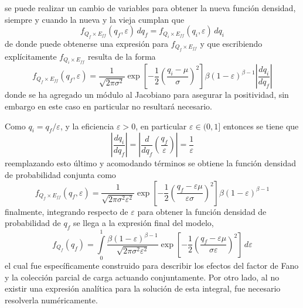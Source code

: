 se puede realizar un cambio de variables para obtener la nueva función densidad, siempre y cuando la nueva y la vieja cumplan que
\begin{equation*}
    f_{Q_{f}\times E_{ff}}(q_{f}, \varepsilon)\,dq_{f} =
    f_{Q_{i}\times E_{ff}}(q_{i}, \varepsilon)\,dq_{i}
\end{equation*}
de donde puede obtenerse una expresión para $f_{Q_{f}\times E_{ff}}$ y que escribiendo explícitamente $f_{Q_{i}\times E_{ff}}$ resulta de la forma
\begin{equation*}
    f_{Q_{f}\times E_{ff}}(q_{f}, \varepsilon)
    = 
    \frac{1}{\sqrt{2\pi \sigma^{2}}}
    \exp
        \left[
            -\frac{1}{2}
            \left(
                \frac{q_{i} - \mu}{\sigma}
            \right)^{2}
        \right]
    \beta(1-\varepsilon)^{\beta - 1}
    \left|
        \frac{dq_{i}}{dq_{f}}
    \right|
\end{equation*}
donde se ha agregado un módulo al Jacobiano para asegurar la positividad, sin embargo en este caso en particular no resultará necesario. 

Como $q_{i} = q_{f}/\varepsilon$, y la eficiencia $\varepsilon > 0$, en particular $\varepsilon \in (0, 1]$ entonces se tiene que 
\begin{equation*}
    \left|
        \frac{dq_{i}}{dq_{f}}
    \right|
        = 
    \left|
        \frac{d}{dq_{f}}
        \left(
            \frac{q_{f}}{\varepsilon}
        \right)
    \right|
        = 
        \frac{1}{\varepsilon}
\end{equation*}
reemplazando esto último y acomodando términos se obtiene la función densidad de probabilidad conjunta como
\begin{equation*}
    f_{Q_{f}\times E_{ff}}(q_{f}, \varepsilon)
    = 
    \frac{1}{\sqrt{2\pi \sigma^{2}\varepsilon^{2}}}
    \exp
        \left[
            -\frac{1}{2}
            \left(
                \frac{q_{f} - \varepsilon\mu}{\varepsilon\sigma}
            \right)^{2}
        \right]
    \beta(1-\varepsilon)^{\beta - 1}
\end{equation*}
finalmente, integrando respecto de $\varepsilon$ para obtener la función densidad de probabilidad de $q_{f}$ se llega a la expresión final del modelo,
\begin{equation}
    f_{Q_{f}}(q_{f}) = 
    \int\limits_{0}^{1}
    \frac{\beta(1-\varepsilon)^{\beta - 1}}{\sqrt{2\pi \sigma^{2}\varepsilon^{2}}}
    \exp
        \left[
            -\frac{1}{2}
            \left(
                \frac{q_{f} - \varepsilon\mu}{\sigma\varepsilon}
            \right)^{2}
        \right]\,
    d\varepsilon
    \label{ec:DistribucionFinal}
\end{equation}
el cual fue específicamente construido para describir los efectos del factor de Fano y la colección parcial de carga actuando conjuntamente. Por otro lado, al no existir una expresión analítica para la solución de esta integral, fue necesario resolverla numéricamente.

